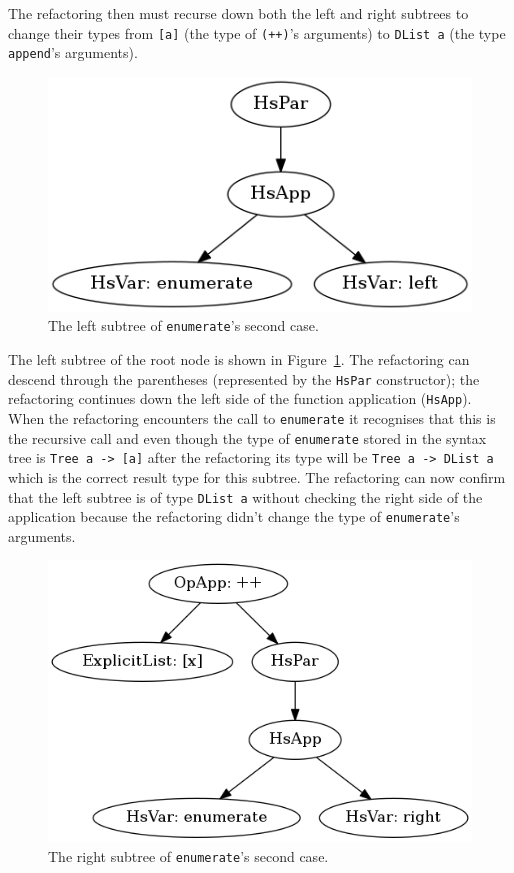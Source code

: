 The refactoring then must recurse down both the left and right subtrees to change their types from \texttt{[a]} (the type of \texttt{(++)}'s arguments) to \texttt{DList a} (the type \texttt{append}'s arguments). 

\begin{figure}[h]
	\begin{center}
		\includegraphics[scale=.5]{graphVis/Chapter3/enumLeft.png}
	\end{center}
	\caption{The left subtree of \texttt{enumerate}'s second case.}
	\label{enumLeft}
\end{figure}

The left subtree of the root node is shown in Figure~\ref{enumLeft}. The refactoring can descend through the parentheses (represented by the \texttt{HsPar} constructor); the refactoring continues down the left side of the function application (\texttt{HsApp}). When the refactoring encounters the call to \texttt{enumerate} it recognises that this is the recursive call and even though the type of \texttt{enumerate} stored in the syntax tree is \texttt{Tree a -> [a]} after the refactoring its type will be \texttt{Tree a -> DList a} which is the correct result type  for this subtree. The refactoring can now confirm that the left subtree is of type \texttt{DList a} without checking the right side of the application because the refactoring didn't change the type of \texttt{enumerate}'s arguments.

\begin{figure}[h]
	\begin{center}
		\includegraphics[scale=.5]{graphVis/Chapter3/enumRight.png}
	\end{center}
	\caption{The right subtree of \texttt{enumerate}'s second case.}
	\label{enumRight}
\end{figure}

